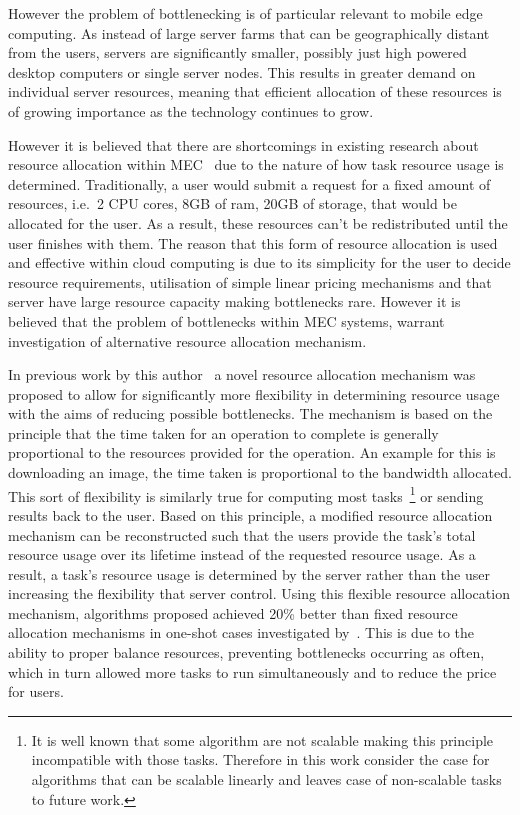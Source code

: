 However the problem of bottlenecking is of particular relevant to mobile edge computing. As instead of large server
farms that can be geographically distant from the users, servers are significantly smaller, possibly
just high powered desktop computers or single server nodes. This results in greater demand on individual server
resources, meaning that efficient allocation of these resources is of growing importance as the technology continues to
grow.

However it is believed that there are shortcomings in existing research about resource allocation within
MEC~\citep{vaji_infocom, Bi2019} due to the nature of how task resource usage is determined. Traditionally,
a user would submit a request for a fixed amount of resources, i.e.\ 2 CPU cores, 8GB of ram, 20GB of storage, that
would be allocated for the user. As a result, these resources can't be redistributed until the user finishes with them.
The reason that this form of resource allocation is used and effective within cloud computing is due to its simplicity
for the user to decide resource requirements, utilisation of simple linear pricing mechanisms and that server have large
resource capacity making bottlenecks rare. However it is believed that the problem of bottlenecks within MEC systems,
warrant investigation of alternative resource allocation mechanism.

In previous work by this author~\citep{FlexibleResourceAllocation} a novel resource allocation mechanism was
proposed to allow for significantly more flexibility in determining resource usage with the aims of reducing possible
bottlenecks. The mechanism is based on the principle that the time taken for an operation to complete is generally
proportional to the resources provided for the operation. An example for this is downloading an image, the time taken
is proportional to the bandwidth allocated. This sort of flexibility is similarly true for computing most
tasks~\footnote{It is well known that some algorithm are not scalable making this principle incompatible with those
tasks. Therefore in this work consider the case for algorithms that can be scalable linearly and leaves case of
non-scalable tasks to future work.}
or sending results back to the user. Based on this principle, a modified resource allocation mechanism can be
reconstructed such that the users provide the task's total resource usage over its lifetime instead of the requested
resource usage. As a result, a task's resource usage is determined by the server rather than the user increasing the
flexibility that server control. Using this flexible resource allocation mechanism, algorithms proposed achieved 20\%
better than fixed resource allocation mechanisms in one-shot cases investigated by~\cite{FlexibleResourceAllocation}.
This is due to the ability to proper balance resources, preventing bottlenecks occurring as often, which in turn allowed
more tasks to run simultaneously and to reduce the price for users.

